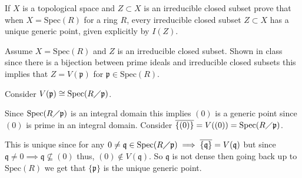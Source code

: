 \documentclass[12pt, letterpaper]{article}
\newcommand{\p}{\mathfrak{p}}
\newcommand{\Spec}{\mathrm{Spec}}
\newcommand{\mf}[1]{\mathfrak{#1}}
\begin{document}
\color{\TextColor}
\pagecolor{\colormode}
\setlength{\parindent}{0pt}
\pagestyle{fancy}
\fancyhf{}

\begin{problem}{}
    If $X$ is a topological space and $Z \subset X$ is an irreducible closed subset prove that when $X= \Spec(R)$ for a ring $R$,
    every irreducible closed subset $Z \subset X$ has a unique generic point, given explicitly by $I(Z)$.
\end{problem}
\begin{problemproof}
    Assume $X=\Spec(R)$ and $Z$ is an irreducible closed subset. Shown in class since there is a bijection between prime ideals and irreducible closed subsets
    this implies that $Z=V(\p)$ for $\p \in \Spec(R)$.

    Consider $V(\p) \cong \Spec(R \diagup \p)$.

    Since $\Spec(R \diagup \p)$ is an integral domain this implies $(0)$ is a generic point since $(0)$ is prime in an integral domain. 
    Consider $\overline{\{(0)\}}=V((0))=\Spec(R \diagup \p)$.

    This is unique since for any $0 \neq \mf{q} \in \Spec(R \diagup \p) \implies \overline{\{\mf{q}\}}=V(\mf{q})$ but since $\mf{q} \neq 0 \implies \mf{q} \nsubseteq (0)$ thus, $(0) \notin V(\mf{q})$. 
    So $\mf{q}$ is not dense then going back up to $\Spec(R)$ we get that $\{\p\}$ is the unique generic point.
\end{problemproof}
\end{document}
